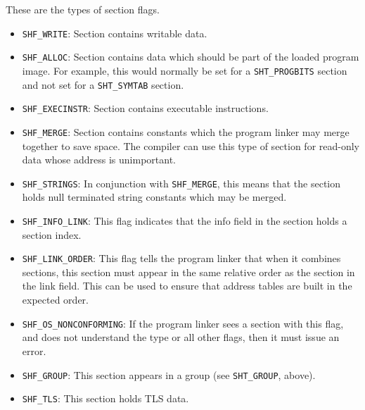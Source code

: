 These are the types of section flags.

\begin{itemize}
    \item \texttt{SHF\_WRITE}: Section contains writable data.

    \item \texttt{SHF\_ALLOC}: Section contains data which should be part of the
          loaded program image.  For example, this would normally be set for a
          \texttt{SHT\_PROGBITS} section and not set for a \texttt{SHT\_SYMTAB}
          section.

    \item \texttt{SHF\_EXECINSTR}: Section contains executable instructions.

    \item \texttt{SHF\_MERGE}: Section contains constants which the program linker
          may merge together to save space.  The compiler can use this type of
          section for read-only data whose address is unimportant.

    \item \texttt{SHF\_STRINGS}: In conjunction with \texttt{SHF\_MERGE}, this
          means that the section holds null terminated string constants which
          may be merged.

    \item \texttt{SHF\_INFO\_LINK}: This flag indicates that the info field in the
          section holds a section index.

    \item \texttt{SHF\_LINK\_ORDER}: This flag tells the program linker that when
          it combines sections, this section must appear in the same relative
          order as the section in the link field.  This can be used to ensure
          that address tables are built in the expected order.

    \item \texttt{SHF\_OS\_NONCONFORMING}: If the program linker sees a section
          with this flag, and does not understand the type or all other flags,
          then it must issue an error.

    \item \texttt{SHF\_GROUP}: This section appears in a group (see
          \texttt{SHT\_GROUP}, above).

    \item \texttt{SHF\_TLS}: This section holds TLS data.
\end{itemize}
